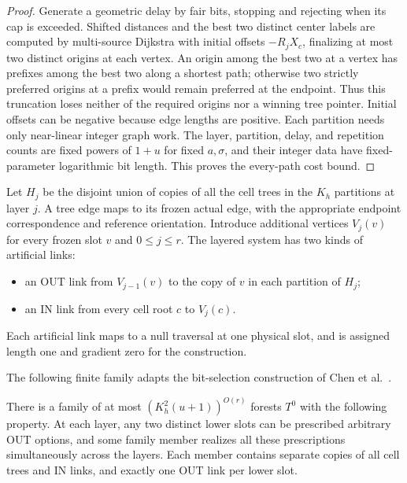 \begin{proof}
Generate a geometric delay by fair bits, stopping and rejecting when
its cap is exceeded.  Shifted distances and the best two distinct
center labels are computed by multi-source Dijkstra with initial
offsets $-R_jX_c$, finalizing at most two distinct origins at each
vertex.  An origin among the best two at a vertex has prefixes among
the best two along a shortest path; otherwise two strictly preferred
origins at a prefix would remain preferred at the endpoint.  Thus this
truncation loses neither of the required origins nor a winning tree
pointer.  Initial offsets can be negative because edge lengths are
positive.  Each partition needs only near-linear integer graph work.
The layer, partition, delay, and repetition counts are fixed powers of
$1+u$ for fixed $a,\sigma$, and their integer data have
fixed-parameter logarithmic bit length.  This proves the every-path
cost bound.
\end{proof}

Let $H_j$ be the disjoint union of copies of all the cell trees in the
$K_h$ partitions at layer $j$.  A tree edge maps to its frozen actual
edge, with the appropriate endpoint correspondence and reference
orientation.  Introduce additional vertices $V_j(v)$ for every frozen
slot $v$ and $0\le j\le r$.  The layered system has two kinds of
artificial links:
\begin{itemize}
\item an OUT link from $V_{j-1}(v)$ to the copy of $v$ in each partition
of $H_j$;
\item an IN link from every cell root $c$ to $V_j(c)$.
\end{itemize}
Each artificial link maps to a null traversal at one physical slot,
and is assigned length one and gradient zero for the construction.

The following finite family adapts the bit-selection construction of
Chen et al.\ \cite[Definition~4.30 and Lemma~4.31]{IncrementalGraphs}.

\begin{lemma}
\label{back:forest-family}
There is a family of at most $(K_h^2(u+1))^{O(r)}$ forests $T^0$ with
the following property.  At each layer, any two distinct lower slots
can be prescribed arbitrary OUT options, and some family member
realizes all these prescriptions simultaneously across the layers.
Each member contains separate copies of all cell trees and IN links,
and exactly one OUT link per lower slot.
\end{lemma}

